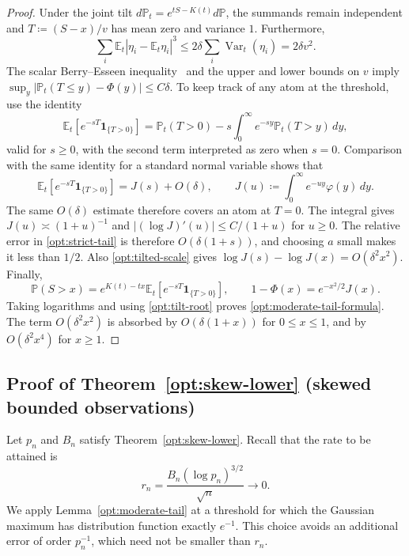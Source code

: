 \documentclass[11pt,letterpaper]{article}
\theoremstyle{remark}
\newcommand{\E}{\mathbb E}
\newcommand{\Pp}{\mathbb P}
\newcommand{\Var}{\operatorname{Var}}
\newcommand{\ind}{\mathbf 1}
\begin{document}
\begin{proof}
Under the joint tilt
\(d\Pp_t=e^{tS-K(t)}d\Pp\), the summands remain independent and
\(T\coloneqq(S-x)/v\) has mean zero and variance \(1\). Furthermore,
\[
 \sum_i\E_t|\eta_i-\E_t\eta_i|^3
 \le2\delta\sum_i\Var_t(\eta_i)=2\delta v^2.
\]
The scalar Berry--Esseen inequality~\cite{Berry1941} and the upper and lower bounds on \(v\) imply
\(\sup_y|\Pp_t(T\le y)-\Phi(y)|\le C\delta\).
To keep track of any atom at the threshold, use the identity
\[
 \E_t[e^{-sT}\ind_{\{T>0\}}]
 =\Pp_t(T>0)-s\int_0^\infty e^{-sy}\Pp_t(T>y)\,dy,
\]
valid for \(s\ge0\), with the second term interpreted as zero when
\(s=0\). Comparison with
the same identity for a standard normal variable shows that
\begin{equation}
 \E_t[e^{-sT}\ind_{\{T>0\}}]=J(s)+O(\delta),\qquad
 J(u)\coloneqq\int_0^\infty e^{-uy}\varphi(y)\,dy.
 \label{opt:strict-tail}
\end{equation}
The same \(O(\delta)\) estimate therefore covers an atom at \(T=0\).
The integral gives \(J(u)\asymp(1+u)^{-1}\) and
\(|(\log J)'(u)|\le C/(1+u)\) for \(u\ge0\).
The relative error in \eqref{opt:strict-tail} is therefore
\(O(\delta(1+s))\), and choosing \(a\) small makes it less than \(1/2\).
Also \eqref{opt:tilted-scale} gives
\(\log J(s)-\log J(x)=O(\delta^2x^2)\).
Finally,
\[
 \Pp(S>x)=e^{K(t)-tx}\E_t[e^{-sT}\ind_{\{T>0\}}],\qquad
 1-\Phi(x)=e^{-x^2/2}J(x).
\]
Taking logarithms and using \eqref{opt:tilt-root} proves
\eqref{opt:moderate-tail-formula}. The term \(O(\delta^2x^2)\) is
absorbed by \(O(\delta(1+x))\) for \(0\le x\le1\), and by
\(O(\delta^2x^4)\) for \(x\ge1\).
\end{proof}


\subsection{Proof of Theorem~\ref*{opt:skew-lower} (skewed bounded observations)}

\label{app:skew-proof}
Let \(p_n\) and \(B_n\) satisfy Theorem~\ref{opt:skew-lower}.
Recall that the rate to be attained is
\[
 r_n=\frac{B_n(\log p_n)^{3/2}}{\sqrt n}\longrightarrow0.
\]
We apply Lemma~\ref{opt:moderate-tail} at a threshold for which the
Gaussian maximum has distribution function exactly \(e^{-1}\).
This choice avoids an additional error of order \(p_n^{-1}\),
which need not be smaller than \(r_n\).
\end{document}
